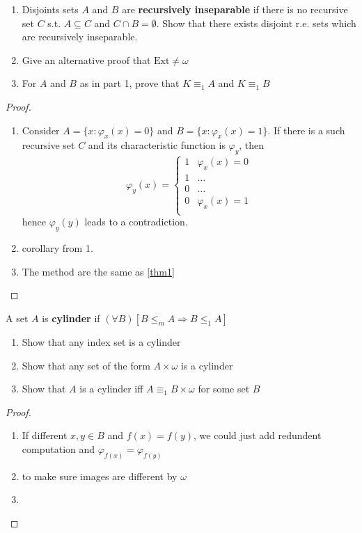 \documentclass[11pt]{article}
\begin{document}
\begin{exercise}
\begin{enumerate}
\item Disjoints sets \(A\) and \(B\) are \textbf{recursively inseparable} if there is no
recursive set \(C\) s.t. \(A\subseteq C\) and \(C\cap B=\emptyset\). Show that
there exists disjoint r.e. sets which are recursively inseparable.
\item Give an alternative proof that \(\text{Ext}\neq\omega\)
\item For \(A\) and \(B\) as in part 1, prove that \(K\equiv_1 A\) and \(K\equiv_1 B\)
\end{enumerate}
\end{exercise}
\begin{proof}
\begin{enumerate}
\item Consider \(A=\{x:\varphi_x(x)=0\}\) and \(B=\{x:\varphi_x(x)=1\}\). If there
is a such recursive set \(C\) and its characteristic function is
\(\varphi_y\), then
\begin{equation*}
\varphi_y(x)=
\begin{cases}
1&\varphi_x(x)=0\\
1&\dots\\
0&\dots\\
0&\varphi_x(x)=1\\
\end{cases}
\end{equation*}
hence \(\varphi_y(y)\) leads to a contradiction.
\item corollary from 1.
\item The method are the same as \ref{thm1}
\end{enumerate}
\end{proof}

\begin{exercise}
A set \(A\) is \textbf{cylinder} if \((\forall B)[B\le_m A\Longrightarrow B\le_1 A]\)
\begin{enumerate}
\item Show that any index set is a cylinder
\item Show that any set of the form \(A\times\omega\) is a cylinder
\item Show that \(A\) is a cylinder iff \(A\equiv_1 B\times\omega\) for some set \(B\)
\end{enumerate}
\end{exercise}

\begin{proof}
\begin{enumerate}
\item If different \(x,y\in B\) and \(f(x)=f(y)\), we could just add redundent
computation and \(\varphi_{f(x)}=\varphi_{f(y)}\)
\item to make sure images are different by \(\omega\)
\item 
\end{enumerate}
\end{proof}
\end{document}
